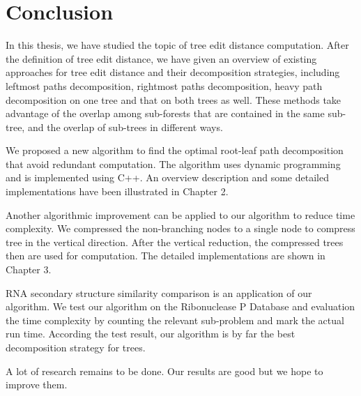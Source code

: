 \doublespacing
\chapter{Conclusion}
In this thesis, we have studied the topic of tree edit distance computation. After the definition of tree edit distance, we have given an overview of existing approaches for tree edit distance and their decomposition strategies, including leftmost paths decomposition, rightmost paths decomposition, heavy path decomposition on one tree and that on both trees as well. These methods take advantage of the overlap among sub-forests that are contained in the same sub-tree, and the overlap of sub-trees in different ways. 

We proposed a new algorithm to find the optimal root-leaf path decomposition that avoid redundant computation. The algorithm uses dynamic programming and is implemented using C++. An overview description and some detailed implementations have been illustrated in Chapter 2.

Another algorithmic improvement can be applied to our algorithm to reduce time complexity. We compressed the non-branching nodes to a single node to compress tree in the vertical direction. After the vertical reduction, the compressed trees then are used for computation. The detailed implementations are shown in Chapter 3.

RNA secondary structure similarity comparison is an application of our algorithm. We test our algorithm on the Ribonuclease P Database and evaluation the time complexity by counting the relevant sub-problem and mark the actual run time. According the test result, our algorithm is by far the best decomposition strategy for trees. 
 
A lot of research remains to be done. Our results are good but we hope to improve them. 